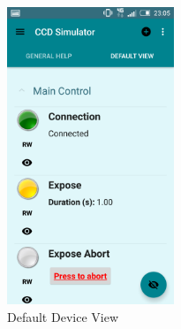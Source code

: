 \begin{figure}
 \centering
 \includegraphics[width=5cm]{../images/defaultView.png}
 \caption{Default Device View}
 \label{fig:defaultView}
\end{figure}




